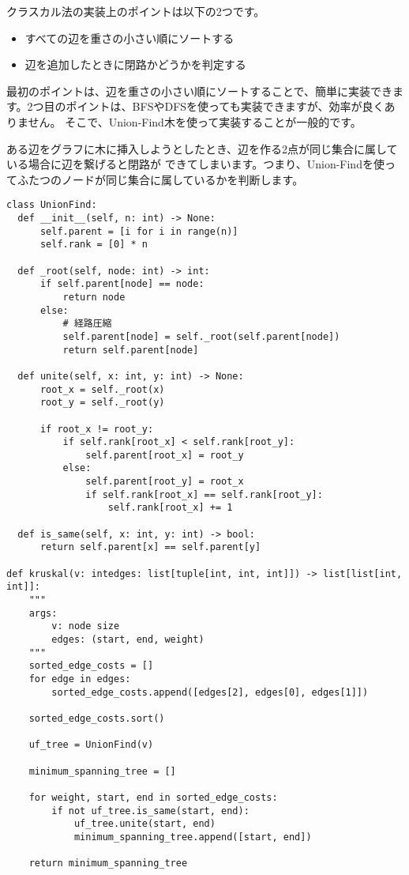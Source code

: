 \documentclass{jlreq}
\begin{document}
\vspace{0.5cm}

クラスカル法の実装上のポイントは以下の2つです。

\begin{itemize}
  \item すべての辺を重さの小さい順にソートする
  \item 辺を追加したときに閉路かどうかを判定する
\end{itemize}

最初のポイントは、辺を重さの小さい順にソートすることで、簡単に実装できます。2つ目のポイントは、BFSやDFSを使っても実装できますが、効率が良くありません。
そこで、Union-Find木を使って実装することが一般的です。

ある辺をグラフに木に挿入しようとしたとき、辺を作る2点が同じ集合に属している場合に辺を繋げると閉路が
できてしまいます。つまり、Union-Findを使ってふたつのノードが同じ集合に属しているかを判断します。

\begin{lstlisting}[caption=クラスカル法の実装, label=kruskal, frame=TRBL, label={kruskal}]
class UnionFind:
  def __init__(self, n: int) -> None:
      self.parent = [i for i in range(n)]
      self.rank = [0] * n
  
  def _root(self, node: int) -> int:
      if self.parent[node] == node:
          return node
      else:
          # 経路圧縮
          self.parent[node] = self._root(self.parent[node])
          return self.parent[node]
  
  def unite(self, x: int, y: int) -> None:
      root_x = self._root(x)
      root_y = self._root(y)
      
      if root_x != root_y:
          if self.rank[root_x] < self.rank[root_y]:
              self.parent[root_x] = root_y
          else:
              self.parent[root_y] = root_x
              if self.rank[root_x] == self.rank[root_y]:
                  self.rank[root_x] += 1

  def is_same(self, x: int, y: int) -> bool:
      return self.parent[x] == self.parent[y]

def kruskal(v: intedges: list[tuple[int, int, int]]) -> list[list[int, int]]:
    """
    args:
        v: node size
        edges: (start, end, weight)
    """
    sorted_edge_costs = []
    for edge in edges:
        sorted_edge_costs.append([edges[2], edges[0], edges[1]])
    
    sorted_edge_costs.sort()
    
    uf_tree = UnionFind(v)
    
    minimum_spanning_tree = []
    
    for weight, start, end in sorted_edge_costs:
        if not uf_tree.is_same(start, end):
            uf_tree.unite(start, end)
            minimum_spanning_tree.append([start, end])
    
    return minimum_spanning_tree
\end{lstlisting}
\end{document}
